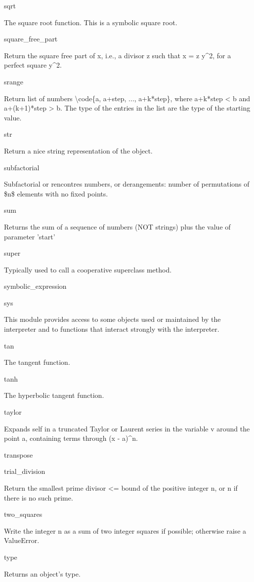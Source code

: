 \documentclass[12pt,oneside]{book}
\begin{document}
sqrt

The square root function. This is a symbolic square root.

square\_free\_part

Return the square free part of x, i.e., a divisor z such that x = z y\^{}2, for a perfect square y\^{}2.

srange

Return list of numbers {\textbackslash}code\{a, a+step, ..., a+k*step\}, where a+k*step {\textless} b and a+(k+1)*step {\textgreater} b. The type of the entries in the list are the type of the starting value.

str

Return a nice string representation of the object.

subfactorial

Subfactorial or rencontres numbers, or derangements: number of permutations of \$n\$ elements with no fixed points.

sum

Returns the sum of a sequence of numbers (NOT strings) plus the value of parameter 'start'

super

Typically used to call a cooperative superclass method.

symbolic\_expression 


sys

This module provides access to some objects used or maintained by the interpreter and to functions that interact strongly with the interpreter.

tan

The tangent function.

tanh

The hyperbolic tangent function.

taylor

Expands self in a truncated Taylor or Laurent series in the variable v around the point a, containing terms through (x {}- a)\^{}n.

transpose


trial\_division

Return the smallest prime divisor {\textless}= bound of the positive integer n, or n if there is no such prime.

two\_squares

Write the integer n as a sum of two integer squares if possible; otherwise raise a ValueError.

type

Returns an object's type.
\end{document}

